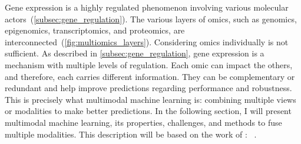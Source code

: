 \documentclass[../main.tex]{subfiles}
\begin{document}
	Gene expression is a highly regulated phenomenon involving various molecular actors~(\cref{subsec:gene_regulation}).
	The various layers of omics, such as genomics, epigenomics, transcriptomics, and proteomics, are interconnected~(\cref{fig:multiomics_layers}).
	Considering omics individually is not sufficient.
	As described in \cref{subsec:gene_regulation}, gene expression is a mechanism with multiple levels of regulation.
	Each omic can impact the others, and therefore, each carries different information.
	They can be complementary or redundant and help improve predictions regarding performance and robustness.
	This is precisely what multimodal machine learning is: combining multiple views or modalities to make better predictions.
	In the following section, I will present multimodal machine learning, its properties, challenges, and methods to fuse multiple modalities.
	This description will be based on the work of \citeauthor{MML_morency}: ~\cite{MML_morency}.
\end{document}

